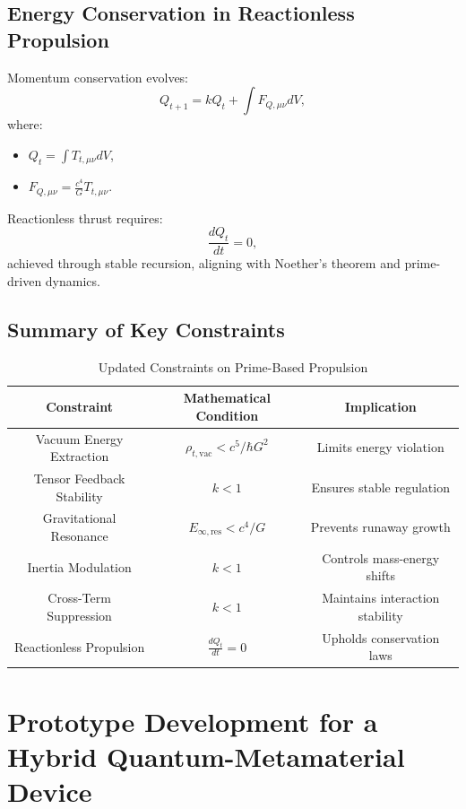 \documentclass{article}
\theoremstyle{plain}
\begin{document}
\subsection{Energy Conservation in Reactionless Propulsion}
\label{subsec:energy_conservation}

Momentum conservation evolves:
\begin{equation}
    Q_{t+1} = k Q_t + \int F_{Q,\mu\nu} dV,
\end{equation}
where:
\begin{itemize}
    \item \( Q_t = \int T_{t,\mu\nu} dV \),
    \item \( F_{Q,\mu\nu} = \frac{c^4}{G} T_{t,\mu\nu} \).
\end{itemize}
Reactionless thrust requires:
\begin{equation}
    \frac{dQ_t}{dt} = 0,
\end{equation}
achieved through stable recursion, aligning with Noether’s theorem and prime-driven dynamics.

\subsection{Summary of Key Constraints}
\begin{table}[h]
    \centering
    \begin{tabular}{|c|c|c|}
        \hline
        \textbf{Constraint} & \textbf{Mathematical Condition} & \textbf{Implication} \\
        \hline
        Vacuum Energy Extraction & \( \rho_{t,\text{vac}} < c^5 / \hbar G^2 \) & Limits energy violation \\
        Tensor Feedback Stability & \( k < 1 \) & Ensures stable regulation \\
        Gravitational Resonance & \( E_{\infty,\text{res}} < c^4 / G \) & Prevents runaway growth \\
        Inertia Modulation & \( k < 1 \) & Controls mass-energy shifts \\
        Cross-Term Suppression & \( k < 1 \) & Maintains interaction stability \\
        Reactionless Propulsion & \( \frac{dQ_t}{dt} = 0 \) & Upholds conservation laws \\
        \hline
    \end{tabular}
    \caption{Updated Constraints on Prime-Based Propulsion}
\end{table}

\section{Prototype Development for a Hybrid Quantum-Metamaterial Device}
\label{sec:prototype}
\end{document}
